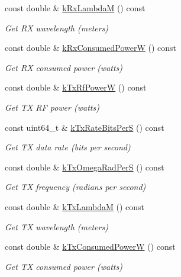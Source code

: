 \begin{DoxyCompactItemize}
const double \& \hyperlink{classosse_1_1collaborate_1_1_modem_a3e5ffe93c09f9e615d6706bcf66a5b92}{k\+Rx\+LambdaM} () const
\begin{DoxyCompactList}\small\item\em Get RX wavelength (meters) \end{DoxyCompactList}\item 
const double \& \hyperlink{classosse_1_1collaborate_1_1_modem_a1d7fde5092bef180161739258d68acc4}{k\+Rx\+Consumed\+PowerW} () const
\begin{DoxyCompactList}\small\item\em Get RX consumed power (watts) \end{DoxyCompactList}\item 
const double \& \hyperlink{classosse_1_1collaborate_1_1_modem_aa4af2bbf6ffd0c09e3a817620bb0354b}{k\+Tx\+Rf\+PowerW} () const
\begin{DoxyCompactList}\small\item\em Get TX RF power (watts) \end{DoxyCompactList}\item 
const uint64\+\_\+t \& \hyperlink{classosse_1_1collaborate_1_1_modem_a375ff44cbc39181e15e3bfc839551cb4}{k\+Tx\+Rate\+Bits\+PerS} () const
\begin{DoxyCompactList}\small\item\em Get TX data rate (bits per second) \end{DoxyCompactList}\item 
const double \& \hyperlink{classosse_1_1collaborate_1_1_modem_a42bfe0c78e94eaf71bd3186b6bde1e9d}{k\+Tx\+Omega\+Rad\+PerS} () const
\begin{DoxyCompactList}\small\item\em Get TX frequency (radians per second) \end{DoxyCompactList}\item 
const double \& \hyperlink{classosse_1_1collaborate_1_1_modem_a327712f883fdd72e91b238c018064998}{k\+Tx\+LambdaM} () const
\begin{DoxyCompactList}\small\item\em Get TX wavelength (meters) \end{DoxyCompactList}\item 
const double \& \hyperlink{classosse_1_1collaborate_1_1_modem_adc5837932829df64bacec3ed4bef6134}{k\+Tx\+Consumed\+PowerW} () const
\begin{DoxyCompactList}\small\item\em Get TX consumed power (watts) \end{DoxyCompactList}\end{DoxyCompactItemize}
